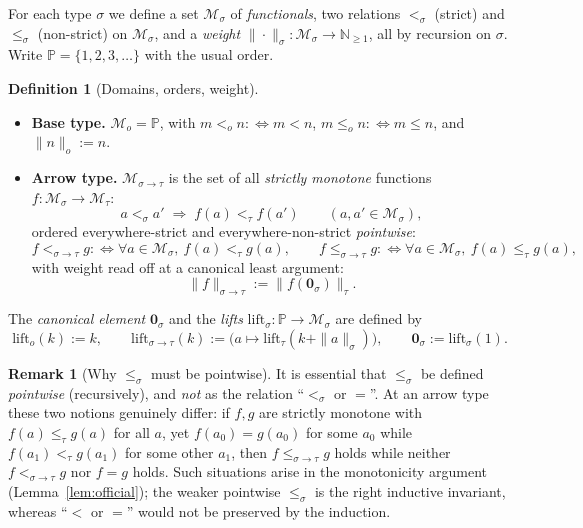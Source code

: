 \documentclass{amsart}
\theoremstyle{definition}
\newtheorem{definition}{Definition}
\newtheorem{remark}{Remark}
\begin{document}
For each type $\sigma$ we define a set $\mathcal M_\sigma$ of \emph{functionals}, two
relations $<_\sigma$ (strict) and $\le_\sigma$ (non-strict) on $\mathcal M_\sigma$, and
a \emph{weight} $\|\cdot\|_\sigma:\mathcal M_\sigma\to\mathbb N_{\ge 1}$, all by
recursion on $\sigma$. Write $\mathbb P=\{1,2,3,\dots\}$ with the usual order.

\begin{definition}[Domains, orders, weight]\label{def:dom}
\leavevmode
\begin{itemize}
\item \textbf{Base type.}
  $\mathcal M_o=\mathbb P$, with $m<_o n :\Leftrightarrow m<n$,
  $m\le_o n:\Leftrightarrow m\le n$, and $\|n\|_o:=n$.
\item \textbf{Arrow type.}
  $\mathcal M_{\sigma\to\tau}$ is the set of all \emph{strictly monotone} functions
  $f:\mathcal M_\sigma\to\mathcal M_\tau$:
  \[
    a<_\sigma a' \;\Longrightarrow\; f(a)<_\tau f(a')
    \qquad(a,a'\in\mathcal M_\sigma),
  \]
  ordered everywhere-strict and everywhere-non-strict \emph{pointwise}:
  \[
    f<_{\sigma\to\tau}g :\Leftrightarrow
    \forall a\in\mathcal M_\sigma,\ f(a)<_\tau g(a),
    \qquad
    f\le_{\sigma\to\tau}g :\Leftrightarrow
    \forall a\in\mathcal M_\sigma,\ f(a)\le_\tau g(a),
  \]
  with weight read off at a canonical least argument:
  \[
    \|f\|_{\sigma\to\tau}:=\|f(\mathbf 0_\sigma)\|_\tau .
  \]
\end{itemize}
The \emph{canonical element} $\mathbf 0_\sigma$ and the \emph{lifts}
$\mathrm{lift}_\sigma:\mathbb P\to\mathcal M_\sigma$ are defined by
\[
  \mathrm{lift}_o(k):=k,\qquad
  \mathrm{lift}_{\sigma\to\tau}(k):=\bigl(a\mapsto\mathrm{lift}_\tau(k+\|a\|_\sigma)\bigr),
  \qquad \mathbf 0_\sigma:=\mathrm{lift}_\sigma(1).
\]
\end{definition}

\begin{remark}[Why $\le_\sigma$ must be pointwise]\label{rem:leq}
It is essential that $\le_\sigma$ be defined \emph{pointwise} (recursively), and
\emph{not} as the relation ``$<_\sigma$ or $=$''. At an arrow type these two notions
genuinely differ: if $f,g$ are strictly monotone with $f(a)\le_\tau g(a)$ for all $a$,
yet $f(a_0)=g(a_0)$ for some $a_0$ while $f(a_1)<_\tau g(a_1)$ for some other $a_1$, then
$f\le_{\sigma\to\tau}g$ holds while neither $f<_{\sigma\to\tau}g$ nor $f=g$ holds. Such
situations arise in the monotonicity argument (Lemma~\ref{lem:official}); the weaker
pointwise $\le_\sigma$ is the right inductive invariant, whereas ``$<$ or $=$'' would not
be preserved by the induction.
\end{remark}
\end{document}
